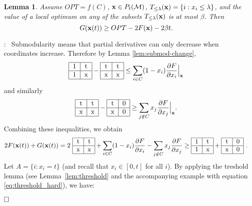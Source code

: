 \documentclass{article}[11pt]
\newtheorem{lemma}[theorem]{Lemma}
\newcommand{\partdiff}[2]{\frac{\partial {#1}}{\partial {#2}}}
\renewenvironment{proof}{\noindent{\bf Proof}:~}{$\hfill \Box$\\}
\newcommand{\T}[4] {\begin{tabular}{|c|c|}
\hline
#1 & #2 \\
\hline
#3 & #4 \\
\hline
\end{tabular}}
\def\bx{{\bf x}}
\def\cM{{\cal M}}
\def\G{{G}}
\begin{document}
\begin{lemma}
\label{lem:OPT-bound}
Assume $OPT=f(C)$, $\bx \in P_t(\cM)$,
$T_{\le\lambda}(\bx) = \{ i: x_i \leq \lambda \}$, and the value
of a local optimum on any of the subsets $T_{\le\lambda}(\bx)$ is at most $\beta$.
Then
$$ \G(\bx(t)) \geq OPT - 2 F(\bx) - 2 \beta t .$$
\end{lemma}

\begin{proof}
Submodularity means that partial derivatives can only decrease when coordinates
increase. Therefore by Lemma \ref{lem:submod-change},
$$ \T{1}{t}{1}{x} -\T{t}{t}{x}{x}  \leq \sum_{i \in C} (1-x_i) \partdiff{F}{x_i} \Big|_\bx $$
and similarly
$$ \T{t}{t}{x}{x} -\T{t}{0}{x}{0} \geq \sum_{j \notin C} x_j \partdiff{F}{x_j} \Big|_\bx.$$
Combining these inequalities, we obtain
\begin{equation}
\label{eq:vee-wedge}
2F(\bx(t)) + \G(\bx(t)) = 2~ \T{t}{t}{x}{x} + \sum_{i \in C} (1-x_i) \partdiff{F}{x_i}
 - \sum_{j \notin C} x_j \partdiff{F}{x_j} \geq \T{1}{t}{1}{x} + \T{t}{0}{x}{0}~.
\end{equation}
Let $A = \{i: x_i = t\}$ (and recall that $x_i \in [0,t]$ for all $i$). 
By applying the treshold lemma (see Lemma~\ref{lem:threshold} and the accompanying
example with equation \eqref{eq:threshold_hard}), we have:



\end{proof}
\end{document}
